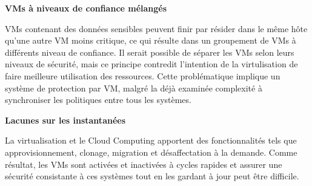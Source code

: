 \textbf{VMs à niveaux de confiance mélangés}

VMs contenant des données sensibles peuvent finir par résider dans le même hôte qu'une autre VM moins critique, ce qui résulte dans un groupement de VMs à différents niveau de confiance. Il serait possible de séparer les VMs selon leurs niveaux de sécurité, mais ce principe contredit l'intention de la virtulisation de faire meilleure utilisation des ressources. Cette problématique implique un système de protection par VM, malgré la déjà examinée complexité à synchroniser les politiques entre tous les systèmes.

\textbf{Lacunes sur les instantanées}

La virtualisation et le Cloud Computing apportent des fonctionnalités tels que approvisionnement, clonage, migration et désaffectation à la demande. Comme résultat, les VMs sont activées et inactivées à cycles rapides et assurer une sécurité consistante à ces systèmes tout en les gardant à jour peut être difficile.

